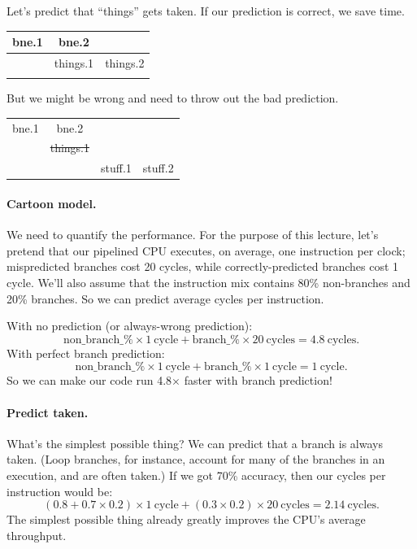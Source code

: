 \documentclass[a4paper]{report}
\begin{document}
\begin{minipage}{.49\textwidth}
Let's predict that ``things'' gets taken.
If our prediction is correct, we save time.

\begin{center}
\begin{tabular}{c|c|c}
bne.1 & bne.2 \\ \hline
& things.1 & things.2 \\
\\
\end{tabular}
\end{center}
\end{minipage} \hspace*{.02\textwidth} \begin{minipage}{.49\textwidth}
But we might be wrong and need to throw out the bad prediction.

\begin{center}
\begin{tabular}{c|c|c|c}
bne.1 & bne.2 \\ \cline{1-2}
& \sout{things.1} \\ \hline
& & stuff.1 & stuff.2
\end{tabular}
\end{center}
\end{minipage}

\paragraph{Cartoon model.} We need to quantify the performance.
For the purpose of this lecture, let's pretend that our pipelined
CPU executes, on average, one instruction per clock;
mispredicted branches cost 20 cycles, while correctly-predicted
branches cost 1 cycle. We'll also assume that the instruction
mix contains 80\% non-branches and 20\% branches. So we can predict
average cycles per instruction.

With no prediction (or always-wrong prediction):
\[
\mathrm{non\_branch\_\%} \times 1 \mathrm{~cycle} + \mathrm{branch\_\%} \times 20 \mathrm{~cycles} = 4.8 \mathrm{~cycles}.
\]
With perfect branch prediction:
\[
\mathrm{non\_branch\_\%} \times 1 \mathrm{~cycle} + \mathrm{branch\_\%} \times 1 \mathrm{~cycle} = 1 \mathrm{~cycle}.
\]
So we can make our code run 4.8$\times$ faster with branch prediction!

\paragraph{Predict taken.} What's the simplest possible thing? We can
predict that a branch is always taken. (Loop branches, for instance,
account for many of the branches in an execution, and are often taken.)
If we got 70\% accuracy, then our cycles per instruction would be:
\[
(0.8 + 0.7 \times 0.2) \times 1 \mathrm{~cycle} + (0.3 \times 0.2) \times 20 \mathrm{~cycles} = 2.14 \mathrm{~cycles}.
\]
The simplest possible thing already greatly improves the CPU's average throughput.
\end{document}
